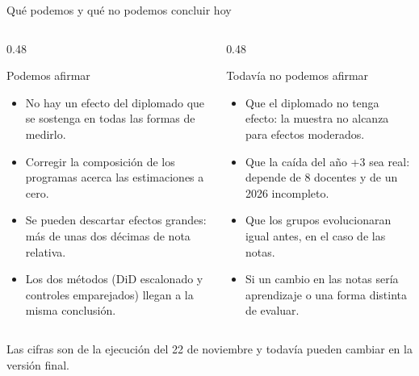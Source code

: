 \documentclass[10pt,aspectratio=169]{beamer}
\begin{document}
\begin{frame}{Qué podemos y qué no podemos concluir hoy}
  \begin{columns}[T]
    \begin{column}{0.48\textwidth}
      \begin{block}{Podemos afirmar}
        \begin{itemize}\small
          \item No hay un efecto del diplomado que se sostenga en todas las formas de medirlo.
          \item Corregir la composición de los programas acerca las estimaciones a cero.
          \item Se pueden descartar efectos grandes: más de unas dos décimas de nota relativa.
          \item Los dos métodos (DiD escalonado y controles emparejados) llegan a la misma conclusión.
        \end{itemize}
      \end{block}
    \end{column}
    \begin{column}{0.48\textwidth}
      \begin{alertblock}{Todavía no podemos afirmar}
        \begin{itemize}\small
          \item Que el diplomado no tenga efecto: la muestra no alcanza para efectos moderados.
          \item Que la caída del año +3 sea real: depende de 8 docentes y de un 2026 incompleto.
          \item Que los grupos evolucionaran igual antes, en el caso de las notas.
          \item Si un cambio en las notas sería aprendizaje o una forma distinta de evaluar.
        \end{itemize}
      \end{alertblock}
    \end{column}
  \end{columns}
  \vspace{0.4em}
  {\small Las cifras son de la ejecución del 22 de noviembre y todavía pueden cambiar en la versión final.}
\end{frame}
\end{document}
